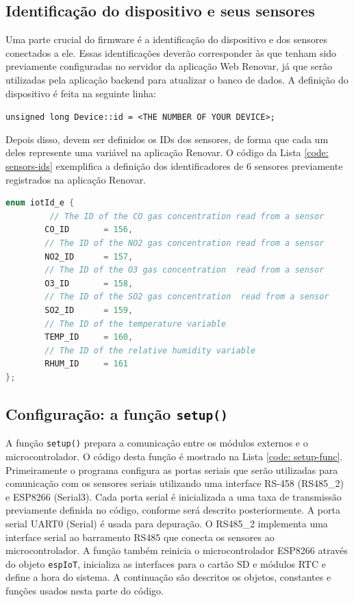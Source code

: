 \subsection{Identificação do dispositivo e seus sensores}

Uma parte crucial do firmware é a identificação do dispositivo e dos sensores conectados a ele. Essas identificações deverão corresponder às que tenham sido previamente configuradas no servidor da aplicação Web Renovar, já que serão utilizadas pela aplicação backend para atualizar o banco de dados. A definição do dispositivo é feita na seguinte linha:

\texttt{unsigned long Device::id = <THE NUMBER OF YOUR DEVICE>;}

Depois disso, devem ser definidos os IDs dos sensores, de forma que cada um deles represente uma variável na aplicação Renovar. O código da Lista \ref{code: sensors-ids} exemplifica a definição dos identificadores de 6 sensores previamente registrados na aplicação Renovar. 

\begin{lstlisting}[language=C++, caption=Definição dos identificadores dos sensores de um dispositivo]
    enum iotId_e {      
         // The ID of the CO gas concentration read from a sensor
        CO_ID       = 156,
        // The ID of the NO2 gas concentration read from a sensor
        NO2_ID      = 157, 
        // The ID of the O3 gas concentration  read from a sensor
        O3_ID       = 158,
        // The ID of the SO2 gas concentration  read from a sensor
        SO2_ID      = 159, 
        // The ID of the temperature variable
        TEMP_ID     = 160,
        // The ID of the relative humidity variable
        RHUM_ID     = 161
};
\end{lstlisting}
\label{code: sensors-ids}

\subsection{Configuração: a função \texttt{setup()}}

A função \texttt{setup()} prepara a comunicação entre os módulos externos e o microcontrolador. O código desta função é mostrado na Lista \ref{code: setup-func}. Primeiramente o programa configura as portas seriais que serão utilizadas para comunicação com os sensores seriais utilizando uma interface RS-458 (RS485\_2) e ESP8266 (Serial3). Cada porta serial é inicializada a uma taxa de transmissão previamente definida no código, conforme será descrito posteriormente. A porta serial UART0 (Serial) é usada para depuração. O RS485\_2 implementa uma interface serial ao barramento RS485 que conecta os sensores ao microcontrolador. A função também reinicia o microcontrolador ESP8266 através do objeto \texttt{espIoT}, inicializa as interfaces para o cartão SD e módulos RTC e define a hora do sistema. A continuação são descritos os objetos, constantes e funções usados nesta parte do código.

